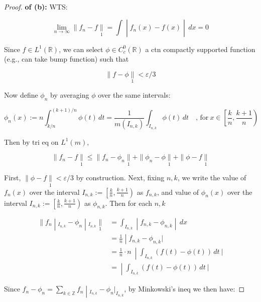\documentclass{qlnotes-export}
\begin{document}
\begin{proof}

\textbf{of (b):} WTS:

\[\left. \lim\limits_{n\rightarrow\infty} \parallel f_{n} - f\underset{1}{\parallel} = \int \middle| f_{n}(x) - f(x) \middle| \, dx = 0 \right.\]

Since \(f \in L^{1}({\mathbb{R}})\), we can select \(\phi \in C_{c}^{0}({\mathbb{R}})\) a ctn compactly supported function (e.g., can take bump function) such that

\[\parallel f - \phi\underset{1}{\parallel} < \varepsilon/3\]

Now define \(\phi_{n}\) by averaging \(\phi\) over the same intervals:

\[\phi_{n}(x) := n\int_{k/n}^{(k + 1)/n}\phi(t)\, dt = \frac{1}{m(I_{n,k})}\int_{I_{n,k}}\phi(t)\, dt\quad\text{, for}\ x \in \left\lbrack {\frac{k}{n},\frac{k + 1}{n}} \right)\]

Then by tri eq on \(L^{1}(m)\),

\[\parallel f_{n} - f\underset{1}{\parallel} \leq \parallel f_{n} - \phi_{n}\underset{1}{\parallel} + \parallel \phi_{n} - \phi\underset{1}{\parallel} + \parallel \phi - f\underset{1}{\parallel}\]

First, \(\parallel \phi - f\underset{1}{\parallel} < \varepsilon/3\) by construction. Next, fixing \(n,k\), we write the value of \(f_{n}(x)\) over the interval \(I_{n,k} := \left\lbrack {\frac{k}{n},\frac{k + 1}{n}} \right)\) as \(f_{n,k}\), and value of \(\phi_{n}(x)\) over the interval \(I_{n,k} := \left\lbrack {\frac{k}{n},\frac{k + 1}{n}} \right)\) as \(\phi_{n,k}\). Then for each \(n,k\)

\[\begin{matrix}
\left. \parallel f_{n} \middle| {}_{I_{n,k}} - \phi_{n} \middle| {}_{I_{n,k}}\underset{1}{\parallel} \right. & \left. = \int_{I_{n,k}} \middle| f_{n,k} - \phi_{n,k} \middle| \, dx \right. \\
 & \left. = \frac{1}{n} \middle| f_{n,k} - \phi_{n,k}| \right. \\
 & \left. = \frac{1}{n} \cdot n\  \middle| \int_{I_{n,k}}(f(t) - \phi(t))\, dt\ | \right. \\
 & \left. = \middle| \int_{I_{n,k}}(f(t) - \phi(t))\, dt\ | \right.
\end{matrix}\]

Since \(\left. f_{n} - \phi_{n} = \sum_{k \in {\mathbb{Z}}}f_{n} \middle| {}_{I_{n,k}} - \phi_{n}|_{I_{n,k}} \right.\), by Minkowski's ineq we then have:


\end{proof}
\end{document}
